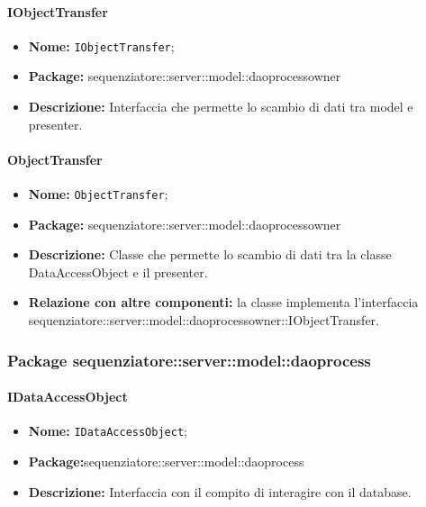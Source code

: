 \paragraph{IObjectTransfer}
	\begin{itemize}
		\item \textbf{Nome:} \texttt{IObjectTransfer};
		\item \textbf{Package:} sequenziatore::server::model::daoprocessowner
		\item \textbf{Descrizione:} Interfaccia che permette lo scambio di dati tra model e presenter.
	\end{itemize}
\paragraph{ObjectTransfer}
	\begin{itemize}
		\item \textbf{Nome:} \texttt{ObjectTransfer};
		\item \textbf{Package:} sequenziatore::server::model::daoprocessowner
		\item \textbf{Descrizione:} Classe che permette lo scambio di dati tra la classe DataAccessObject e il presenter.
		\item \textbf{Relazione con altre componenti:} la classe implementa l'interfaccia sequenziatore::server::model::daoprocessowner::IObjectTransfer.
	\end{itemize}
\subsubsection{Package sequenziatore::server::model::daoprocess}
\paragraph{IDataAccessObject}
	\begin{itemize}
		\item \textbf{Nome:} \texttt{IDataAccessObject};
		\item \textbf{Package:}sequenziatore::server::model::daoprocess
		\item \textbf{Descrizione:} Interfaccia con il compito di interagire con il database.
	\end{itemize}
